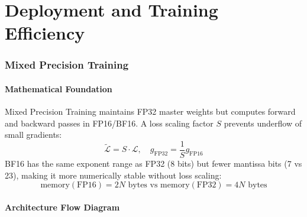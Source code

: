 \newpage
\part{Deployment and Training Efficiency}

\section{Mixed Precision Training}

\subsection{Mathematical Foundation}
Mixed Precision Training maintains FP32 master weights but computes forward and backward passes in FP16/BF16. A loss scaling factor $S$ prevents underflow of small gradients:
\begin{equation}
  \tilde{\mathcal{L}} = S \cdot \mathcal{L},\quad g_{\text{FP32}} = \frac{1}{S} g_{\text{FP16}}
\end{equation}
BF16 has the same exponent range as FP32 (8 bits) but fewer mantissa bits (7 vs 23), making it more numerically stable without loss scaling:
\begin{equation}
  \text{memory}(\text{FP16}) = 2N \text{ bytes vs } \text{memory}(\text{FP32}) = 4N \text{ bytes}
\end{equation}

\subsection{Architecture Flow Diagram}

